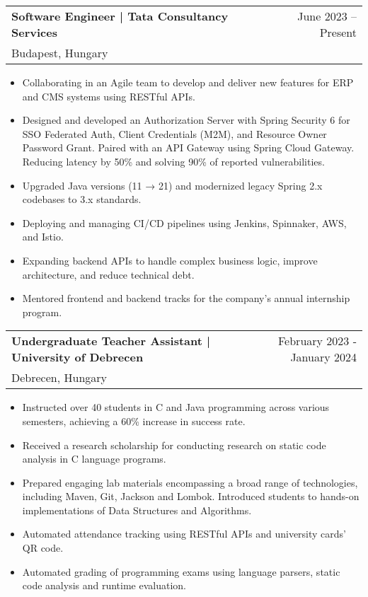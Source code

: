 \documentclass[a4paper,12pt]{article}
\makeatletter
\newenvironment{joblong}[3]
    {
    \begin{tabularx}{\linewidth}{@{}l X r@{}}
    \textbf{#1} & \hfill &  #2 \\[1.75pt]
    {#3} & & \\[9.75pt]
    \end{tabularx}
    \begin{minipage}[t]{\linewidth}
    \begin{itemize}[nosep,after=\strut, leftmargin=1em, itemsep=3pt,label=--]
    }
    {
    \end{itemize}
    \end{minipage}    
    }
\makeatother
\begin{document}
\begin{joblong}
    {Software Engineer | Tata Consultancy Services}
    {June 2023 -- Present}
    {Budapest, Hungary}
\item Collaborating in an Agile team to develop and deliver new features for ERP and CMS systems using RESTful APIs.
\item Designed and developed an Authorization Server with Spring Security 6 for SSO Federated Auth, Client Credentials (M2M), and Resource Owner Password Grant. Paired with an API Gateway using Spring Cloud Gateway. Reducing latency by 50\% and solving 90\% of reported vulnerabilities.
\item Upgraded Java versions (11 → 21) and modernized legacy Spring 2.x codebases to 3.x standards.
\item Deploying and managing CI/CD pipelines using Jenkins, Spinnaker, AWS, and Istio.
\item Expanding backend APIs to handle complex business logic, improve architecture, and reduce technical debt.
\item Mentored frontend and backend tracks for the company's annual internship program.
\end{joblong}

\begin{joblong}
    {Undergraduate Teacher Assistant | University of Debrecen}
    {February 2023 - January 2024}
    {Debrecen, Hungary}
\item Instructed over 40 students in C and Java programming across various semesters, achieving a 60\% increase in success rate.
\item Received a research scholarship for conducting research on static code analysis in C language programs.
\item Prepared engaging lab materials encompassing a broad range of technologies, including Maven, Git, Jackson and Lombok. Introduced students to hands-on implementations of Data Structures and Algorithms.
\item Automated attendance tracking using RESTful APIs and university cards' QR code.
\item Automated grading of programming exams using language parsers, static code analysis and runtime evaluation.
\end{joblong}

\end{document}
